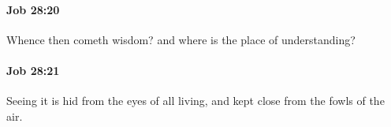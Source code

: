		\paragraph{Job 28:20} %
			\label{JOB-28-20}

			Whence then cometh wisdom? and where is the place of understanding?


		\paragraph{Job 28:21} %
			\label{JOB-28-21}

			Seeing it is hid from the eyes of all living, and kept close from the fowls of the air.


